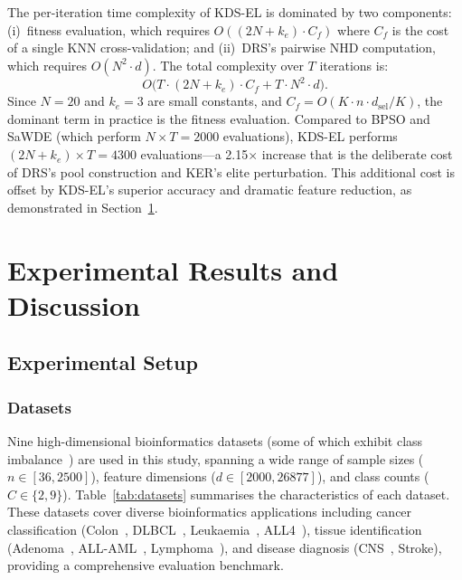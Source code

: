 \documentclass[a4paper,fleqn]{cas-dc}
\begin{document}
\begin{sloppypar}
	\par{
	The per-iteration time complexity of KDS-EL is dominated by two
	components:
	(i)~fitness evaluation, which requires $O((2N + k_e) \cdot C_f)$
	where $C_f$ is the cost of a single KNN cross-validation; and
	(ii)~DRS's pairwise NHD computation, which requires $O(N^2 \cdot d)$.
	The total complexity over $T$ iterations is:
	\begin{equation}
		O\bigl(T \cdot (2N + k_e) \cdot C_f + T \cdot N^2 \cdot d\bigr).
		\label{eq:complexity}
	\end{equation}
	Since $N = 20$ and $k_e = 3$ are small constants, and $C_f = O(K
	\cdot n \cdot d_{\mathrm{sel}} / K)$, the dominant term in practice
	is the fitness evaluation.
	Compared to BPSO and SaWDE (which perform $N \times T = 2000$
	evaluations), KDS-EL performs $(2N + k_e) \times T = 4300$
	evaluations---a 2.15$\times$ increase that is the deliberate cost
	of DRS's pool construction and KER's elite perturbation.
	This additional cost is offset by KDS-EL's superior accuracy and
	dramatic feature reduction, as demonstrated in
	Section~\ref{sec:experiments}.
	}


	\section{Experimental Results and Discussion}
	\label{sec:experiments}

	\subsection{Experimental Setup}
	\label{sec:experiments:setup}

	\subsubsection{Datasets}
	\label{sec:experiments:datasets}

	\par{
	Nine high-dimensional bioinformatics datasets (some of which exhibit
	class imbalance~\citep{chawla2002smote}) are used in this
	study, spanning a wide range of sample sizes ($n \in [36, 2500]$),
	feature dimensions ($d \in [2000, 26877]$), and class counts
	($C \in \{2, 9\}$).
	Table~\ref{tab:datasets} summarises the characteristics of each
	dataset.
	These datasets cover diverse bioinformatics applications including
	cancer classification (Colon~\citep{alon1999broad}, DLBCL~\citep{shipp2002diffuse}, Leukaemia~\citep{golub1999molecular}, ALL4~\citep{yeoh2002classification}), tissue
	identification (Adenoma~\citep{notterman2001microarray}, ALL-AML~\citep{golub1999molecular}, Lymphoma~\citep{alizadeh2000distinct}), and disease diagnosis
	(CNS~\citep{pomeroy2002prediction}, Stroke), providing a comprehensive evaluation benchmark.
	}


\end{sloppypar}
\end{document}
